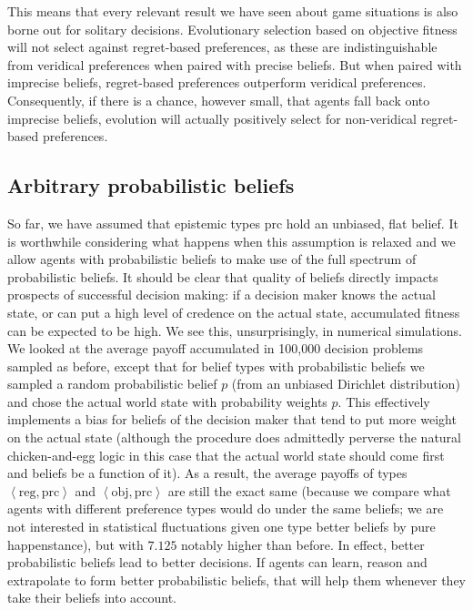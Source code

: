 \documentclass[fleqn,reqno,12pt]{article}
\theoremstyle{Satz}
\theoremstyle{Bsp}
\newcommand{\tuple}[1]{\left \langle #1\right\rangle}
\begin{document}
This means that every relevant result we have seen about game situations is also borne out for
solitary decisions. Evolutionary selection based on objective fitness will not select against
regret-based preferences, as these are indistinguishable from veridical preferences
when paired with precise beliefs. But when paired with imprecise beliefs, regret-based
preferences outperform veridical preferences. Consequently, if there is a chance, however
small, that agents fall back onto imprecise beliefs, evolution will actually positively select
for non-veridical regret-based preferences.


\iffalse
\subsection{Arbitrary probabilistic beliefs}
\label{sec:arbitr-prob-beli}

So far, we have assumed that epistemic types $\text{prc}$ hold an unbiased, flat belief. It is
worthwhile considering what happens when this assumption is relaxed and we allow agents with
probabilistic beliefs to make use of the full spectrum of probabilistic beliefs. It should be
clear that quality of beliefs directly impacts prospects of successful decision making: if a
decision maker knows the actual state, or can put a high level of credence on the actual state,
accumulated fitness can be expected to be high. We see this, unsurprisingly, in numerical
simulations. We looked at the average payoff accumulated in 100,000 decision problems sampled
as before, except that for belief types with probabilistic beliefs we sampled a random
probabilistic belief $p$ (from an unbiased Dirichlet distribution) and chose the actual world
state with probability weights $p$. This effectively implements a bias for beliefs of the
decision maker that tend to put more weight on the actual state (although the procedure does
admittedly perverse the natural chicken-and-egg logic in this case that the actual world state
should come first and beliefs be a function of it). As a result, the average payoffs of types
$\tuple{\text{reg}, \text{prc}}$ and $\tuple{\text{obj}, \text{prc}}$ are still the exact same
(because we compare what agents with different preference types would do under the same
beliefs; we are not interested in statistical fluctuations given one type better beliefs by
pure happenstance), but with $7.125$ notably higher than before. In effect, better
probabilistic beliefs lead to better decisions. If agents can learn, reason and extrapolate to
form better probabilistic beliefs, that will help them whenever they take their beliefs into
account. 
\end{document}
